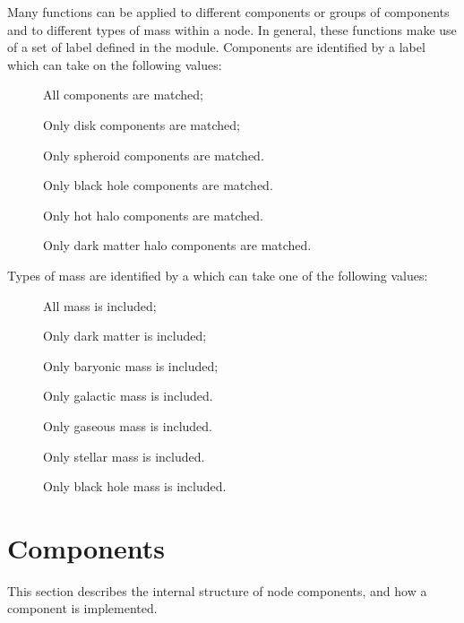 Many functions can be applied to different components or groups of components and to different types of mass within a node. In general, these functions make use of a set of label defined in the \href{https://github.com/galacticusorg/galacticus/releases/download/bleeding-edge/Galacticus_Source.pdf#source.galactic_structure_options_F90:galactic_structure_options}{} module. Components are identified by a  label which can take on the following values:
\begin{description}
 \item [] All components are matched;
 \item [] Only disk components are matched;
 \item [] Only spheroid components are matched.
 \item [] Only black hole components are matched.
 \item [] Only hot halo components are matched.
 \item [] Only dark matter halo components are matched.
\end{description}
Types of mass are identified by a  which can take one of the following values:
\begin{description}
 \item [] All mass is included;
 \item [] Only dark matter is included;
 \item [] Only baryonic mass is included;
 \item [] Only galactic mass is included.
 \item [] Only gaseous mass is included.
 \item [] Only stellar mass is included.
 \item [] Only black hole mass is included.
\end{description}

\section{Components}

This section describes the internal structure of node components, and how a component is implemented.

